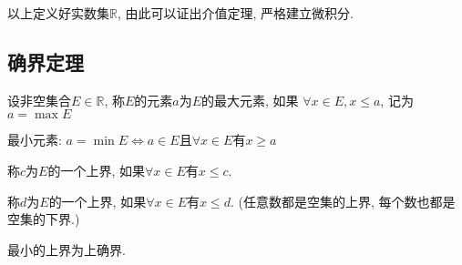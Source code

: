 以上定义好实数集$\mathbb{R}$, 由此可以证出介值定理, 严格建立微积分.

\subsection{确界定理}
\begin{definition}
    设非空集合$E\in \mathbb{R}$, 称$E$的元素$a$为$E$的最大元素, 如果
    $\forall x\in E, x\le a$, 记为 $a = \max E$

    最小元素:
    $a =\min E \iff a \in E \text{且} \forall x\in E \text{有} x\ge a$
\end{definition}

\begin{definition}
    称$c$为$E$的一个上界, 如果$\forall x\in E\text{有}x\le c$.

    称$d$为$E$的一个上界, 如果$\forall x\in E\text{有}x\le d$.
    (任意数都是空集的上界, 每个数也都是空集的下界.)

    最小的上界为上确界.
\end{definition}

